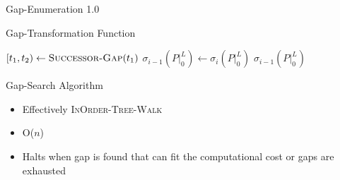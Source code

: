 \documentclass{beamer}
\begin{document}
\begin{section}{Gap-Enumeration 1.0}
\begin{frame}{Gap-Transformation Function\autocite[12]{BelwalCheng}}
\begin{algorithm}[H]
\begin{multicols}{2}
{\begin{algorithmic}[2]
                  \ExitWhile
                \EndIf
                  \State \Call{Gap-Insert}{$\sigma_{i}(P|_{0}^{L}), [t_{1},t)$}
                  \State \Call{Gap-Insert}{$\sigma_{i}(P|_{0}^{L}), [t + C_{j},t_{2})$}
                  \ExitWhile
                \EndIf
                  \State \Call{Gap-Insert}{$\sigma_{i}(P|_{0}^{L}), [t_{1},t)$}
                \EndIf
              \EndIf
              \State $[t_{1},t_{2}) \gets \Call{Successor-Gap}{t_{1}}$
            \EndWhile
          \EndFor
          \State $\sigma_{i-1}(P|_{0}^{L}) \gets \sigma_{i}(P|_{0}^{L})$
          \State \Return $\sigma_{i-1}(P|_{0}^{L})$
        \EndFunction
      \end{algorithmic}
    }
  \end{multicols}
  \end{algorithm}
\end{frame}
\begin{frame}{Gap-Search Algorithm\autocite[12-13]{BelwalCheng}}
  \begin{itemize}
  \item{Effectively \textsc{InOrder-Tree-Walk\autocite[245-246]{CLR}}}
  \item{O($n$)}
  \item{Halts when gap is found that can fit the computational cost or gaps are exhausted}
  \end{itemize}
\end{frame}
\end{section}
\end{document}
